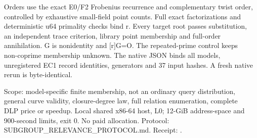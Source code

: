 \documentclass[10pt]{article}
\begin{document}
Orders use the exact E0/F2 Frobenius recurrence and complementary twist
order, controlled by exhaustive small-field point counts. Full exact
factorizations and deterministic u64 primality checks bind r. Every target
root passes substitution, an independent trace criterion, library point
membership and full-order annihilation. G is nonidentity and [r]G=O.
The repeated-prime control keeps non-coprime membership unknown.
The native JSON binds all models, unregistered EC1 record identities,
generators and 37 input hashes. A fresh native rerun is byte-identical.

Scope: model-specific finite membership, not an ordinary query distribution,
general curve validity, closure-degree law, full relation enumeration,
complete DLP price or speedup. Local shared x86-64 host, L0; 12-GiB
address-space and 900-second limits, exit 0. No paid allocation.
Protocol: SUBGROUP_RELEVANCE_PROTOCOL.md.
Receipt: .
\end{document}
